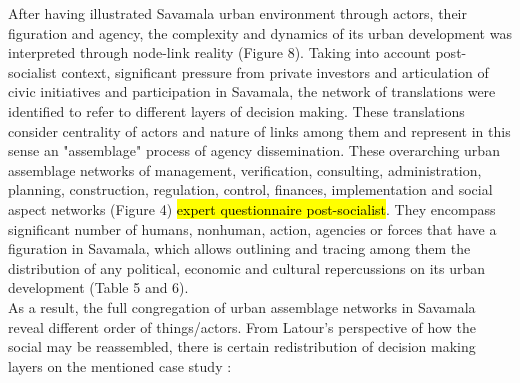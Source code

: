 \documentclass[11pt]{report}
\begin{document}
After having illustrated Savamala urban environment through actors, their figuration and agency, the complexity and dynamics of its urban development was interpreted through node-link reality (Figure 8). Taking into account post-socialist context, significant pressure from private investors and articulation of civic initiatives and participation in Savamala, the network of translations were identified to refer to different layers of decision making.
These translations consider centrality of actors and nature of links among them and represent in this sense an "assemblage" process of agency dissemination. These overarching urban assemblage networks of management, verification, consulting, administration, planning, construction, regulation, control, finances, implementation and social aspect networks (Figure 4) \hl{expert questionnaire post-socialist}. They encompass significant number of humans, nonhuman, action, agencies or forces that have a figuration in Savamala, which allows outlining and tracing among them the distribution of any political, economic and cultural repercussions on its urban development (Table 5 and 6).
\\ 
As a result, the full congregation of urban assemblage networks in Savamala reveal different order of things/actors. From Latour's perspective of how the social may be reassembled, there is certain redistribution of decision making layers on the mentioned case study \cite{Latour 2005}:
\end{document}
